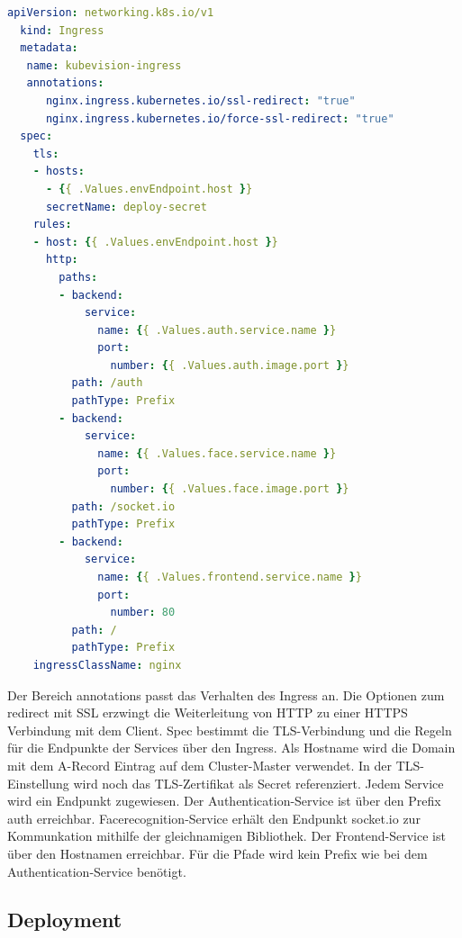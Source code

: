 \begin{lstlisting}[caption={kubevision-ingress.yaml},captionpos=b,label={lst:kubevisioningress},language=yaml]
  apiVersion: networking.k8s.io/v1
  kind: Ingress
  metadata:
   name: kubevision-ingress
   annotations:
      nginx.ingress.kubernetes.io/ssl-redirect: "true"
      nginx.ingress.kubernetes.io/force-ssl-redirect: "true"
  spec:
    tls:
    - hosts:
      - {{ .Values.envEndpoint.host }}
      secretName: deploy-secret
    rules:
    - host: {{ .Values.envEndpoint.host }}
      http:
        paths:
        - backend:
            service:
              name: {{ .Values.auth.service.name }}
              port:
                number: {{ .Values.auth.image.port }}
          path: /auth
          pathType: Prefix
        - backend:
            service:
              name: {{ .Values.face.service.name }}
              port:
                number: {{ .Values.face.image.port }}
          path: /socket.io
          pathType: Prefix
        - backend:
            service:
              name: {{ .Values.frontend.service.name }}
              port:
                number: 80
          path: /
          pathType: Prefix
    ingressClassName: nginx

\end{lstlisting}

Der Bereich annotations passt das Verhalten des Ingress an.
Die Optionen zum redirect mit SSL erzwingt die Weiterleitung von HTTP zu einer HTTPS Verbindung mit dem Client.
Spec bestimmt die TLS-Verbindung und die Regeln für die Endpunkte der Services über den Ingress.
Als Hostname wird die Domain mit dem A-Record Eintrag auf dem Cluster-Master verwendet.
In der TLS-Einstellung wird noch das TLS-Zertifikat als Secret referenziert.
Jedem Service wird ein Endpunkt zugewiesen.
Der Authentication-Service ist über den Prefix auth erreichbar.
Facerecognition-Service erhält den Endpunkt socket.io zur Kommunkation mithilfe der gleichnamigen Bibliothek.
Der Frontend-Service ist über den Hostnamen erreichbar.
Für die Pfade wird kein Prefix wie bei dem Authentication-Service benötigt.



\subsection{Deployment}



